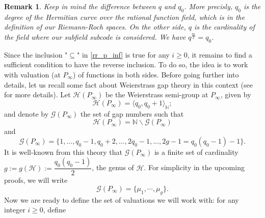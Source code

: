 \documentclass[a4paper]{article}
\newtheorem{rq1}{Remark}
\newcommand{\calH}{\mathcal{H}}
\begin{document}
\begin{rq1}
Keep in mind the difference between $q$ and $q_0$. More precisly, $q_0$ is the degree of the Hermitian curve over the rational function field, which is in the definition of our Riemann-Roch spaces. On the other side, $q$ is the cardinality of the field where our subfield subcode is considered. We have $q^{\frac{m}{2}}=q_0$.
\end{rq1}

Since the inclusion "$\subseteq$" in \eqref{rr_p_inf} is true for any $i \geq 0$, it remains to find a sufficient condition to have the reverse inclusion. To do so, the idea is to work with valuation (at $P_{\infty}$) of functions in both sides. Before going further into details, let us recall some fact about Weierstrass gap theory in this context (see \cite{sti} for more details).
Let $\calH(P_{\infty})$ be the Weierstrass semi-group at $P_{\infty}$, given by
\[\calH(P_{\infty}) = \langle q_0,q_0+1 \rangle_{\mathbb{N}};\]
and denote by  $\mathcal{G}(P_{\infty})$ the set of gap numbers such that
\[\calH(P_{\infty}) = \mathbb{N} \backslash \mathcal{G}(P_{\infty})\]
and 
\[\mathcal{G}(P_{\infty}) = \{1,...,q_0-1,q_0+2,...,2q_0-1,...,2g-1=q_0(q_0-1)-1\}.\]
It is well-known from this theory that $\mathcal{G}(P_{\infty})$ is a finite set of cardinality $g:=g(\calH) := \dfrac{q_0(q_0-1)}{2}$, the genus of $\calH$. For simplicity in the upcoming proofs, we will write 
\[\mathcal{G}(P_{\infty}) = \{\mu_1,\cdots,\mu_g\}.\]
Now we are ready to define the set of valuations we will work with: for any integer $i \geq 0$, define
\end{document}
